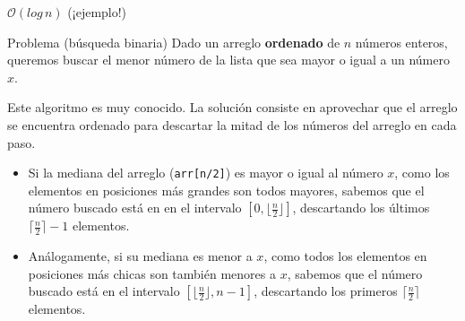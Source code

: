 \documentclass{beamer}
\begin{document}
    \begin{frame}{$\mathcal{O}(log \, n)$ (¡ejemplo!)}
        \begin{block}{Problema (búsqueda binaria)} 
            \pause
            Dado un arreglo \textbf{ordenado} de $n$ números enteros, queremos buscar el menor número de la lista que sea mayor o igual a un número $x$.
        \end{block} \pause
        Este algoritmo es muy conocido. La solución consiste en aprovechar que el arreglo se encuentra ordenado para descartar la mitad de los números del arreglo en cada paso. \pause 

        \begin{itemize}

            \item Si la mediana del arreglo (\texttt{arr[n/2]}) es mayor o igual al número $x$, como los elementos en posiciones más grandes son todos mayores, sabemos que el número buscado está en en el intervalo $[0, \lfloor\frac{n}{2}\rfloor]$, descartando los últimos $\lceil\frac{n}{2}\rceil-1$ elementos. \pause 

            \item Análogamente, si su mediana es menor a $x$, como todos los elementos en posiciones más chicas son también menores a $x$, sabemos que el número buscado está en el intervalo $[\lfloor \frac{n}{2} \rfloor, n-1]$, descartando los primeros $\lceil\frac{n}{2}\rceil$ elementos.
        \end{itemize}
    \end{frame}
    
\end{document}
